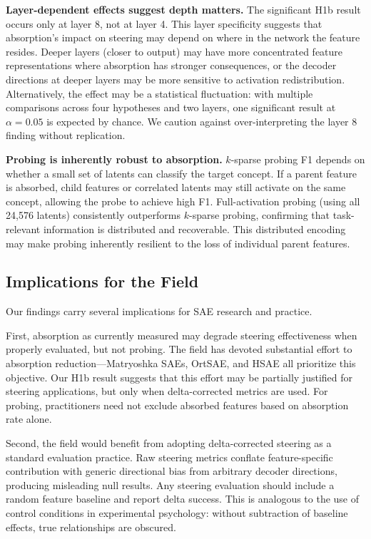 \documentclass{article}
\begin{document}
\textbf{Layer-dependent effects suggest depth matters.} The significant H1b result occurs only at layer 8, not at layer 4. This layer specificity suggests that absorption's impact on steering may depend on where in the network the feature resides. Deeper layers (closer to output) may have more concentrated feature representations where absorption has stronger consequences, or the decoder directions at deeper layers may be more sensitive to activation redistribution. Alternatively, the effect may be a statistical fluctuation: with multiple comparisons across four hypotheses and two layers, one significant result at $\alpha = 0.05$ is expected by chance. We caution against over-interpreting the layer 8 finding without replication.

\textbf{Probing is inherently robust to absorption.} $k$-sparse probing F1 depends on whether a small set of latents can classify the target concept. If a parent feature is absorbed, child features or correlated latents may still activate on the same concept, allowing the probe to achieve high F1. Full-activation probing (using all 24,576 latents) consistently outperforms $k$-sparse probing, confirming that task-relevant information is distributed and recoverable. This distributed encoding may make probing inherently resilient to the loss of individual parent features.

\subsection{Implications for the Field}

Our findings carry several implications for SAE research and practice.

First, absorption as currently measured may degrade steering effectiveness when properly evaluated, but not probing. The field has devoted substantial effort to absorption reduction---Matryoshka SAEs, OrtSAE, and HSAE all prioritize this objective. Our H1b result suggests that this effort may be partially justified for steering applications, but only when delta-corrected metrics are used. For probing, practitioners need not exclude absorbed features based on absorption rate alone.

Second, the field would benefit from adopting delta-corrected steering as a standard evaluation practice. Raw steering metrics conflate feature-specific contribution with generic directional bias from arbitrary decoder directions, producing misleading null results. Any steering evaluation should include a random feature baseline and report delta success. This is analogous to the use of control conditions in experimental psychology: without subtraction of baseline effects, true relationships are obscured.
\end{document}
